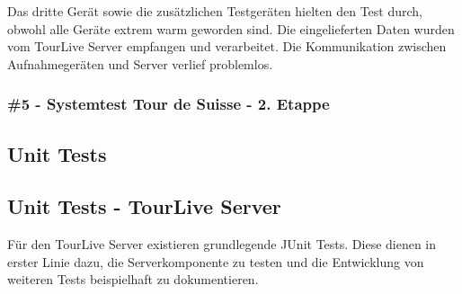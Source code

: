 Das dritte Gerät sowie die zusätzlichen Testgeräten hielten den Test durch, obwohl alle Geräte extrem warm geworden sind. Die eingelieferten Daten wurden vom TourLive Server empfangen und verarbeitet. Die Kommunikation zwischen Aufnahmegeräten und Server verlief problemlos.

\subsubsection{\#5 - Systemtest Tour de Suisse - 2. Etappe}


\subsection{Unit Tests}
\label{sec:unittests}
\subsection{Unit Tests - TourLive Server}
Für den TourLive Server existieren grundlegende JUnit Tests. Diese dienen in erster Linie dazu, die Serverkomponente zu testen und die Entwicklung von weiteren Tests beispielhaft zu dokumentieren.